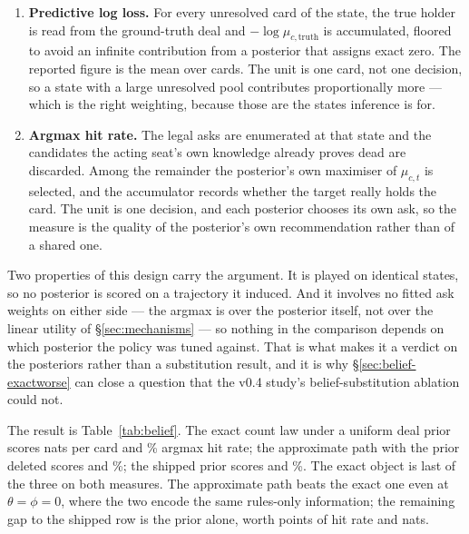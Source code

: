 \begin{enumerate}
  \item \textbf{Predictive log loss.} For every unresolved card of the state, the
        true holder is read from the ground-truth deal and $-\log \mu_{c,
        \text{truth}}$ is accumulated, floored to avoid an infinite contribution
        from a posterior that assigns exact zero. The reported figure is the mean
        over cards. The unit is one card, not one decision, so a state with a
        large unresolved pool contributes proportionally more --- which is the
        right weighting, because those are the states inference is for.
  \item \textbf{Argmax hit rate.} The legal asks are enumerated at that state and
        the candidates the acting seat's own knowledge already proves dead are
        discarded. Among the remainder the posterior's own maximiser of
        $\mu_{c,t}$ is selected, and the accumulator records whether the target
        really holds the card. The unit is one decision, and each posterior
        chooses its own ask, so the measure is the quality of the posterior's own
        recommendation rather than of a shared one.
\end{enumerate}

Two properties of this design carry the argument. It is played on identical
states, so no posterior is scored on a trajectory it induced. And it involves no
fitted ask weights on either side --- the argmax is over the posterior itself,
not over the linear utility of \S\ref{sec:mechanisms} --- so nothing in the
comparison depends on which posterior the policy was tuned against. That is what
makes it a verdict on the posteriors rather than a substitution result, and it is
why \S\ref{sec:belief-exactworse} can close a question that the v0.4 study's
belief-substitution ablation could not.

The result is Table~\ref{tab:belief}. The exact count law under a uniform deal
prior scores \vsixBeliefExactNLL{} nats per card and \vsixBeliefExactHit{}\%
argmax hit rate; the approximate path with the prior deleted scores
\vsixBeliefNoPriorNLL{} and \vsixBeliefNoPriorHit{}\%; the shipped prior scores
\vsixBeliefShippedNLL{} and \vsixBeliefShippedHit{}\%. The exact object is last
of the three on both measures. The approximate path beats the exact one even at
$\theta = \phi = 0$, where the two encode the same rules-only information; the
remaining gap to the shipped row is the prior alone, worth
\numThetaPriorHitGain{} points of hit rate and \numThetaPriorNatGain{} nats.

